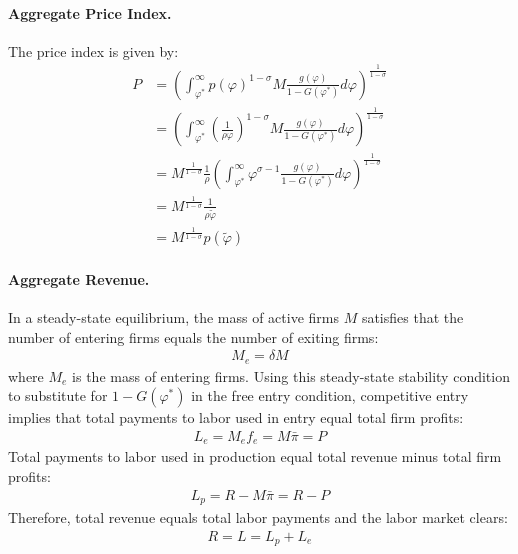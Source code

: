 \begin{solution}
    \paragraph{Aggregate Price Index.} The price index is given by:
    \begin{align*}
        P &= \left( \int_{\varphi^*}^{\infty} p(\varphi)^{1 - \sigma} M \frac{g(\varphi)}{1 - G(\varphi^*)} d\varphi \right)^{\frac{1}{1 - \sigma}} \\
        &= \left( \int_{\varphi^*}^{\infty} \left( \frac{1}{\rho \varphi} \right)^{1 - \sigma} M \frac{g(\varphi)}{1 - G(\varphi^*)} d\varphi \right)^{\frac{1}{1 - \sigma}} \\
        &= M^{\frac{1}{1 - \sigma}} \frac{1}{\rho} \left( \int_{\varphi^*}^{\infty} \varphi^{\sigma - 1} \frac{g(\varphi)}{1 - G(\varphi^*)} d\varphi \right)^{\frac{1}{1 - \sigma}} \\
        &= M^{\frac{1}{1 - \sigma}} \frac{1}{\rho \tilde{\varphi}} \\
        &= M^{\frac{1}{1 - \sigma}} p(\tilde{\varphi})
\end{align*}
\paragraph{Aggregate Revenue.} In a steady-state equilibrium, the mass of active firms $M$ satisfies that the number of entering firms equals the number of exiting firms:
\begin{align*}
    [1-G(\varphi^*)] M_e = \delta M
\end{align*}
where $M_e$ is the mass of entering firms. 
Using this steady-state stability condition to substitute for $1 - G(\varphi^*)$ in the free entry condition, competitive entry implies that total payments to labor used in entry equal total firm profits:
\begin{align*}
    L_e = M_e f_e = M \bar{\pi} = P
\end{align*}
Total payments to labor used in production equal total revenue minus total firm profits:
\begin{align*}
    L_p = R - M \bar{\pi} = R - P
\end{align*}
Therefore, total revenue equals total labor payments and the labor market clears:
\begin{align*}
    R = L = L_p + L_e
\end{align*}

\end{solution}
